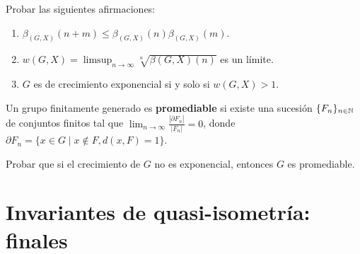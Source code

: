 \documentclass[twoside]{article}
\begin{document}
\newpage

\begin{ejercicio}{2.3}
Probar las siguientes afirmaciones:
\begin{enumerate}
\item $\beta_{(G,X)}(n+m)\leq \beta_{(G,X)}(n)\beta_{(G,X)}(m)$.
\item $w(G,X)=\limsup_{n\to \infty}\sqrt[n]{\beta(G,X)(n)}$ es un límite. 
\item $G$ es de crecimiento exponencial si y solo si $w(G,X)>1$.
\end{enumerate}
\end{ejercicio}
\begin{solucion}

\end{solucion}

\newpage

\begin{ejercicio}{2.4}
Un grupo finitamente generado es \textbf{promediable} si existe una sucesión $\{F_n\}_{n\in\mathbb{N}}$ de conjuntos finitos tal que $\lim_{n\to\infty}\frac{|\partial F_n|}{|F_n|}=0$, donde $\partial F_n=\{x\in G\mid x\notin F, d(x,F)=1\}$.

Probar que si el crecimiento de $G$ no es exponencial, entonces $G$ es promediable. 
\end{ejercicio}
\begin{solucion}

\end{solucion}

\newpage

\section{Invariantes de quasi-isometría: finales}
\begin{ejercicio}{1.10}


\end{ejercicio}
\begin{solucion}

\end{solucion}

\newpage

\begin{ejercicio}{1.11}

\end{ejercicio}
\begin{solucion}
\end{solucion}

\newpage

\begin{ejercicio}{1.12}

\end{ejercicio}
\begin{solucion}

\end{solucion}
\end{document}
